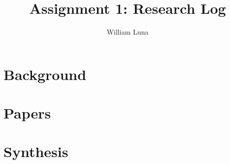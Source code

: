 \documentclass[
	letterpaper, %
]{jdf}
\author{William Luna}
\title{Assignment 1: Research Log}
\begin{document}

\maketitle

\section{Background}



\section{Papers}



\section{Synthesis}
\end{document}
